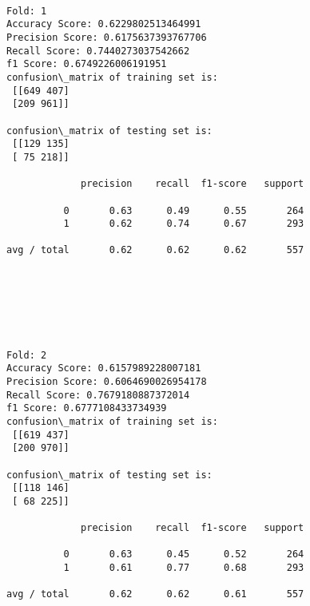 \documentclass[11pt]{article}
\begin{document}
    \begin{Verbatim}[commandchars=\\\{\}]

Fold: 1
Accuracy Score: 0.6229802513464991
Precision Score: 0.6175637393767706
Recall Score: 0.7440273037542662
f1 Score: 0.6749226006191951
confusion\_matrix of training set is: 
 [[649 407]
 [209 961]] 

confusion\_matrix of testing set is: 
 [[129 135]
 [ 75 218]] 

             precision    recall  f1-score   support

          0       0.63      0.49      0.55       264
          1       0.62      0.74      0.67       293

avg / total       0.62      0.62      0.62       557


    \end{Verbatim}

    \begin{center}
    \end{center}
    { \hspace*{\fill} \\}
    
    \begin{center}
    \end{center}
    { \hspace*{\fill} \\}
    
    \begin{Verbatim}[commandchars=\\\{\}]

Fold: 2
Accuracy Score: 0.6157989228007181
Precision Score: 0.6064690026954178
Recall Score: 0.7679180887372014
f1 Score: 0.6777108433734939
confusion\_matrix of training set is: 
 [[619 437]
 [200 970]] 

confusion\_matrix of testing set is: 
 [[118 146]
 [ 68 225]] 

             precision    recall  f1-score   support

          0       0.63      0.45      0.52       264
          1       0.61      0.77      0.68       293

avg / total       0.62      0.62      0.61       557


    \end{Verbatim}

    \begin{center}
    \end{center}
    { \hspace*{\fill} \\}
    
\end{document}
